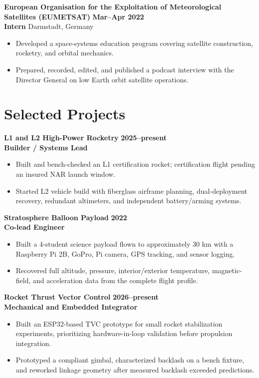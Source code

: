 \documentclass[10pt,letterpaper]{article}
\newcommand{\role}[4]{
  \textbf{#1} \hfill {\color{muted}\textbf{#4}}\\
  {\color{accent}\textbf{#2}} \hfill {\color{muted}#3}
  \vspace{2pt}
}
\newcommand{\project}[4]{
  \textbf{#1} \hfill {\color{muted}\textbf{#4}}\\
  {\color{accent}\textbf{#2}} \hfill {\color{muted}#3}
  \vspace{2pt}
}
\begin{document}
\role{European Organisation for the Exploitation of Meteorological Satellites (EUMETSAT)}{Intern}{Darmstadt, Germany}{Mar--Apr 2022}
\begin{itemize}
  \item Developed a space-systems education program covering satellite construction, rocketry, and orbital mechanics.
  \item Prepared, recorded, edited, and published a podcast interview with the Director General on low Earth orbit satellite operations.
\end{itemize}

\section{Selected Projects}
\project{L1 and L2 High-Power Rocketry}{Builder / Systems Lead}{}{2025--present}
\begin{itemize}
  \item Built and bench-checked an L1 certification rocket; certification flight pending an insured NAR launch window.
  \item Started L2 vehicle build with fiberglass airframe planning, dual-deployment recovery, redundant altimeters, and independent battery/arming systems.
\end{itemize}

\project{Stratosphere Balloon Payload}{Co-lead Engineer}{}{2022}
\begin{itemize}
  \item Built a 4-student science payload flown to approximately 30 km with a Raspberry Pi 2B, GoPro, Pi camera, GPS tracking, and sensor logging.
  \item Recovered full altitude, pressure, interior/exterior temperature, magnetic-field, and acceleration data from the complete flight profile.
\end{itemize}

\project{Rocket Thrust Vector Control}{Mechanical and Embedded Integrator}{}{2026--present}
\begin{itemize}
  \item Built an ESP32-based TVC prototype for small rocket stabilization experiments, prioritizing hardware-in-loop validation before propulsion integration.
  \item Prototyped a compliant gimbal, characterized backlash on a bench fixture, and reworked linkage geometry after measured backlash exceeded predictions.
\end{itemize}
\end{document}
